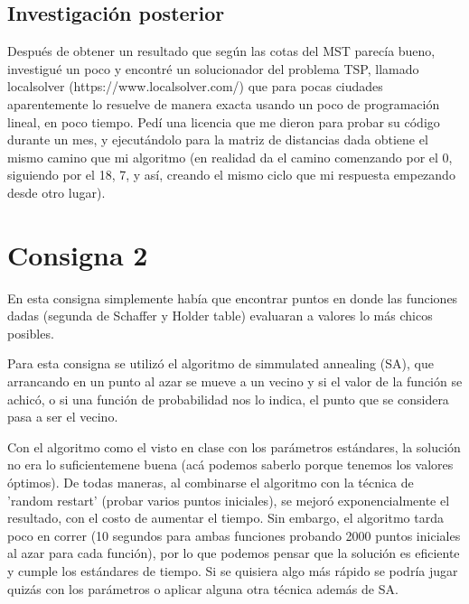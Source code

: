 \documentclass{article}
\begin{document}
\subsection{Investigación posterior}
Después de obtener un resultado que según las cotas del MST parecía bueno, investigué un poco y encontré un solucionador del problema TSP, llamado localsolver (https://www.localsolver.com/) que para pocas ciudades aparentemente lo resuelve de manera exacta usando un poco de programación lineal, en poco tiempo. Pedí una licencia que me dieron para probar su código durante un mes, y ejecutándolo para la matriz de distancias dada obtiene el mismo camino que mi algoritmo (en realidad da el camino comenzando por el 0, siguiendo por el 18, 7, y así, creando el mismo ciclo que mi respuesta empezando desde otro lugar).
\\

\section{Consigna 2}

En esta consigna simplemente había que encontrar puntos en donde las funciones dadas (segunda de Schaffer y Holder table) evaluaran a valores lo más chicos posibles.

Para esta consigna se utilizó el algoritmo de simmulated annealing (SA), que arrancando en un punto al azar se mueve a un vecino y si el valor de la función se achicó, o si una función de probabilidad nos lo indica, el punto que se considera pasa a ser el vecino.

Con el algoritmo como el visto en clase con los parámetros estándares, la solución no era lo suficientemene buena (acá podemos saberlo porque tenemos los valores óptimos).
De todas maneras, al combinarse el algoritmo con la técnica de 'random restart' (probar varios puntos iniciales), se mejoró exponencialmente el resultado, con el costo de aumentar el tiempo. Sin embargo, el algoritmo tarda poco en correr (10 segundos para ambas funciones probando 2000 puntos iniciales al azar para cada función), por lo que podemos pensar que la solución es eficiente y cumple los estándares de tiempo. Si se quisiera algo más rápido se podría jugar quizás con los parámetros o aplicar alguna otra técnica además de SA.
\end{document}
